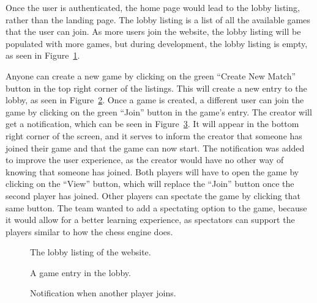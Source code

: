 Once the user is authenticated, the home page would lead to the lobby listing, rather than the landing page.
The lobby listing is a list of all the available games that the user can join.
As more users join the website, the lobby listing will be populated with more games, but during development, the lobby
listing is empty, as seen in Figure~\ref{fig:lobby-empty}.

Anyone can create a new game by clicking on the green ``Create New Match'' button in the top right corner of the
listings.
This will create a new entry to the lobby, as seen in Figure~\ref{fig:lobby-game}.
Once a game is created, a different user can join the game by clicking on the green ``Join'' button in the game's entry.
The creator will get a notification, which can be seen in Figure~\ref{fig:lobby-join}.
It will appear in the bottom right corner of the screen, and it serves to inform the creator that someone has joined
their game and that the game can now start.
The notification was added to improve the user experience, as the creator would have no other way of knowing that
someone has joined.
Both players will have to open the game by clicking on the ``View'' button, which will replace the ``Join'' button once
the second player has joined.
Other players can spectate the game by clicking that same button.
The team wanted to add a spectating option to the game, because it would allow for a better learning experience, as
spectators can support the players similar to how the chess engine does.

\begin{figure}[H]
    \centering
    \setlength{\fboxsep}{0pt}
    \caption{The lobby listing of the website.}\label{fig:lobby-empty}
\end{figure}

\begin{figure}[H]
    \centering
    \setlength{\fboxsep}{0pt}
    \caption{A game entry in the lobby.}\label{fig:lobby-game}
\end{figure}

\begin{figure}[H]
    \centering
    \setlength{\fboxsep}{0pt}
    \caption{Notification when another player joins.}\label{fig:lobby-join}
\end{figure}

